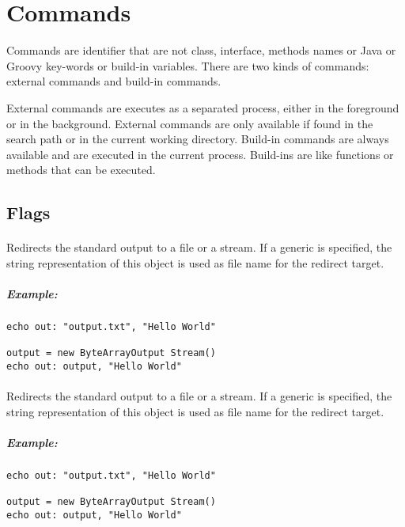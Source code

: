 \section{Commands}

Commands are identifier that are not class, interface, methods names or Java
or Groovy key-words or build-in variables. There are two kinds of commands:
external commands and build-in commands.

External commands are executes as a separated process, either in the foreground
or in the background. External commands are only available if found in the
search path or in the current working directory.
Build-in commands are always available and are executed in the current process.
Build-ins are like functions or methods that can be executed.

\subsection{Flags}

\paragraph{}

Redirects the standard output to a
file or a stream. If a generic  is specified, the string
representation of this object is used as file name for the redirect target.

\subparagraph{Example:}

\begin{lstlisting}[style=Groovybash, label={lst:example_flag_in}]
echo out: "output.txt", "Hello World"

output = new ByteArrayOutput Stream()
echo out: output, "Hello World"
\end{lstlisting}

\paragraph{}

Redirects the standard output to a
file or a stream. If a generic  is specified, the string
representation of this object is used as file name for the redirect target.

\subparagraph{Example:}

\begin{lstlisting}[style=Groovybash, label={lst:example_flag_out}]
echo out: "output.txt", "Hello World"

output = new ByteArrayOutput Stream()
echo out: output, "Hello World"
\end{lstlisting}

